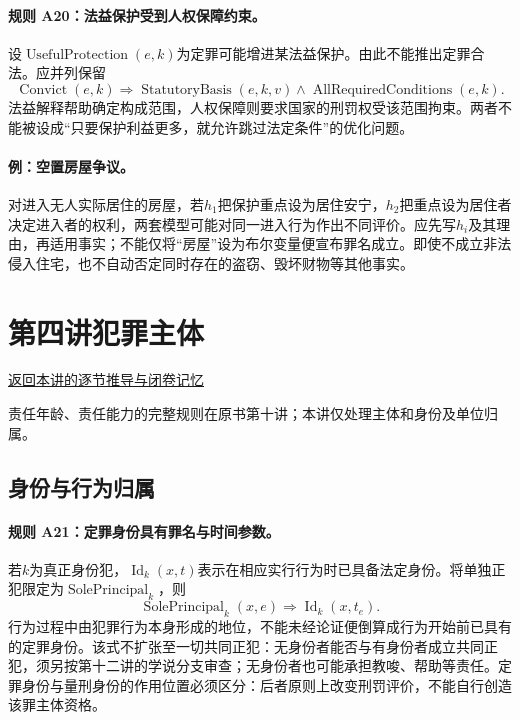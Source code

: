 \paragraph{规则 A20：法益保护受到人权保障约束。}
设$\operatorname{UsefulProtection}(e,k)$为定罪可能增进某法益保护。由此不能推出定罪合法。应并列保留
\[
\operatorname{Convict}(e,k)
\Longrightarrow\operatorname{StatutoryBasis}(e,k,v)
\land\operatorname{AllRequiredConditions}(e,k).
\]
法益解释帮助确定构成范围，人权保障则要求国家的刑罚权受该范围拘束。两者不能被设成“只要保护利益更多，就允许跳过法定条件”的优化问题。

\paragraph{例：空置房屋争议。}
对进入无人实际居住的房屋，若$h_1$把保护重点设为居住安宁，$h_2$把重点设为居住者决定进入者的权利，两套模型可能对同一进入行为作出不同评价。应先写$h_i$及其理由，再适用事实；不能仅将“房屋”设为布尔变量便宣布罪名成立。即使不成立非法侵入住宅，也不自动否定同时存在的盗窃、毁坏财物等其他事实。

\section{第四讲\quad 犯罪主体}

\label{ref:lecture:04}

\noindent\hyperref[lecture:04]{返回本讲的逐节推导与闭卷记忆}

责任年龄、责任能力的完整规则在原书第十讲；本讲仅处理主体和身份及单位归属。

\subsection{身份与行为归属}
\paragraph{规则 A21：定罪身份具有罪名与时间参数。}
若$k$为真正身份犯，$\operatorname{Id}_k(x,t)$表示在相应实行行为时已具备法定身份。将单独正犯限定为$\operatorname{SolePrincipal}_k$，则
\[
\operatorname{SolePrincipal}_k(x,e)
\Longrightarrow\operatorname{Id}_k(x,t_e).
\]
行为过程中由犯罪行为本身形成的地位，不能未经论证便倒算成行为开始前已具有的定罪身份。该式不扩张至一切共同正犯：无身份者能否与有身份者成立共同正犯，须另按第十二讲的学说分支审查；无身份者也可能承担教唆、帮助等责任。定罪身份与量刑身份的作用位置必须区分：后者原则上改变刑罚评价，不能自行创造该罪主体资格。

